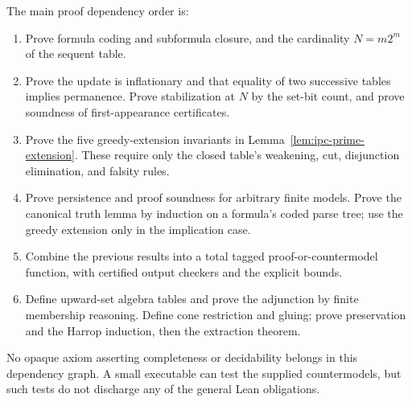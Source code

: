 The main proof dependency order is:
\begin{enumerate}
\item Prove formula coding and subformula closure, and the cardinality
      $N=m2^m$ of the sequent table.
\item Prove the update is inflationary and that equality of two successive
      tables implies permanence. Prove stabilization at $N$ by the set-bit
      count, and prove soundness of first-appearance certificates.
\item Prove the five greedy-extension invariants in
      Lemma~\ref{lem:ipc-prime-extension}. These require only the closed
      table's weakening, cut, disjunction elimination, and falsity rules.
\item Prove persistence and proof soundness for arbitrary finite models.
      Prove the canonical truth lemma by induction on a formula's coded
      parse tree; use the greedy extension only in the implication case.
\item Combine the previous results into a total tagged proof-or-countermodel
      function, with certified output checkers and the explicit bounds.
\item Define upward-set algebra tables and prove the adjunction by finite
      membership reasoning. Define cone restriction and gluing; prove
      preservation and the Harrop induction, then the extraction theorem.
\end{enumerate}
No opaque axiom asserting completeness or decidability belongs in this
dependency graph. A small executable can test the supplied countermodels,
but such tests do not discharge any of the general Lean obligations.
